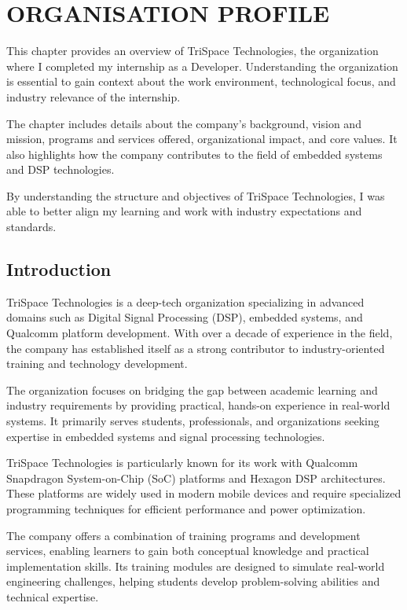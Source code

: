 \documentclass[12pt,a4paper]{report}
\begin{document}
\chapter{ORGANISATION PROFILE}
\label{ch:org}


This chapter provides an overview of TriSpace Technologies, the organization where I completed my internship as a Developer. Understanding the organization is essential to gain context about the work environment, technological focus, and industry relevance of the internship.


The chapter includes details about the company’s background, vision and mission, programs and services offered, organizational impact, and core values. It also highlights how the company contributes to the field of embedded systems and DSP technologies.


By understanding the structure and objectives of TriSpace Technologies, I was able to better align my learning and work with industry expectations and standards.


\section{Introduction}

TriSpace Technologies is a deep-tech organization specializing in advanced domains such as Digital Signal Processing (DSP), embedded systems, and Qualcomm platform development. With over a decade of experience in the field, the company has established itself as a strong contributor to industry-oriented training and technology development.


The organization focuses on bridging the gap between academic learning and industry requirements by providing practical, hands-on experience in real-world systems. It primarily serves students, professionals, and organizations seeking expertise in embedded systems and signal processing technologies.


TriSpace Technologies is particularly known for its work with Qualcomm Snapdragon System-on-Chip (SoC) platforms and Hexagon DSP architectures. These platforms are widely used in modern mobile devices and require specialized programming techniques for efficient performance and power optimization.


The company offers a combination of training programs and development services, enabling learners to gain both conceptual knowledge and practical implementation skills. Its training modules are designed to simulate real-world engineering challenges, helping students develop problem-solving abilities and technical expertise.
\end{document}
